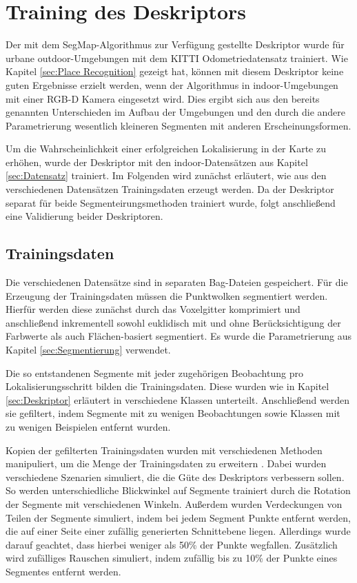 \chapter[Training des Deskriptors (Kopp, Schmelzer)]{Training des Deskriptors}

Der mit dem SegMap-Algorithmus zur Verfügung gestellte Deskriptor wurde für urbane outdoor-Umgebungen mit dem KITTI Odometriedatensatz trainiert. Wie Kapitel \ref{sec:Place Recognition} gezeigt hat, können mit diesem Deskriptor keine guten Ergebnisse erzielt werden, wenn der Algorithmus in indoor-Umgebungen mit einer RGB-D Kamera eingesetzt wird. Dies ergibt sich aus den bereits genannten Unterschieden im Aufbau der Umgebungen und den durch die andere Parametrierung wesentlich kleineren Segmenten mit anderen Erscheinungsformen. 

Um die Wahrscheinlichkeit einer erfolgreichen Lokalisierung in der Karte zu erhöhen, wurde der Deskriptor mit den indoor-Datensätzen aus Kapitel \ref{sec:Datensatz} trainiert. Im Folgenden wird zunächst erläutert, wie aus den verschiedenen Datensätzen Trainingsdaten erzeugt werden. Da der Deskriptor separat für beide Segmenteirungsmethoden trainiert wurde, folgt anschließend eine Validierung beider Deskriptoren. 

\section[Trainingsdaten (Kopp, Schmelzer)]{Trainingsdaten}

Die verschiedenen Datensätze sind in separaten Bag-Dateien gespeichert. Für die Erzeugung der Trainingsdaten müssen die Punktwolken segmentiert werden. Hierfür werden diese zunächst durch das Voxelgitter komprimiert und anschließend inkrementell sowohl euklidisch mit und ohne Berücksichtigung der Farbwerte als auch Flächen-basiert segmentiert. Es wurde die Parametrierung aus Kapitel \ref{sec:Segmentierung} verwendet.  

Die so entstandenen Segmente mit jeder zugehörigen Beobachtung pro \linebreak Lokalisierungsschritt bilden die Trainingsdaten. Diese wurden wie in Kapitel \ref{sec:Deskriptor} erläutert in verschiedene Klassen unterteilt. Anschließend werden sie gefiltert, indem Segmente mit zu wenigen Beobachtungen sowie Klassen mit zu wenigen Beispielen entfernt wurden. 

Kopien der gefilterten Trainingsdaten wurden mit verschiedenen Methoden ma\-ni\-pu\-liert, um die Menge der Trainingsdaten zu erweitern \cite{Dube2019}. Dabei wurden verschiedene Szenarien simuliert, die die Güte  des Deskriptors verbessern sollen. So werden unterschiedliche Blickwinkel auf Segmente trainiert durch die Rotation der Segmente mit verschiedenen Winkeln. Außerdem wurden Verdeckungen von Teilen der Segmente simuliert, indem bei jedem Segment Punkte entfernt werden, die auf einer Seite einer zufällig generierten Schnittebene liegen. Allerdings wurde darauf geachtet, dass hierbei weniger als 50\% der Punkte wegfallen. Zusätzlich wird zufälliges Rauschen simuliert, indem zufällig bis zu 10\% der Punkte eines Segmentes entfernt werden.


